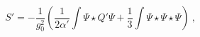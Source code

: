 \begin{equation}\label{actionWF}
S'=-\frac{1}{g_0^2}\left(
\frac{1}{2\alpha'}\int \Psi \star Q'\Psi
+\frac{1}{3}\int \Psi\star\Psi\star\Psi\right) \ , 
\end{equation}

